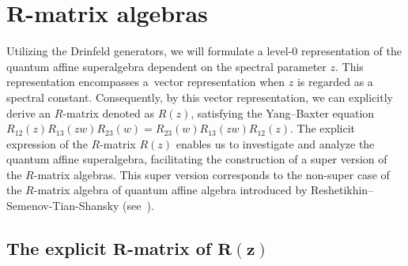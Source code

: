 \documentclass[10pt,a4paper]{amsart}
\numberwithin{equation}{section}
\begin{document}
\section[R-matrix algebras]{$\boldsymbol{R}$-matrix algebras}\label{sec4}
Utilizing the Drinfeld generators, we will formulate a level-$0$ representation of the quantum affine superalgebra dependent on the spectral parameter $z$. This representation encompasses a~vector representation when $z$ is regarded as a spectral constant. Consequently,
by this vector representation, we can explicitly derive an $R$-matrix denoted as $R(z)$, satisfying the Yang--Baxter equation
$R_{12}(z)R_{13}(zw)R_{23}(w)=R_{23}(w)R_{13}(zw)R_{12}(z)$. The explicit expression of the $R$-matrix
$R(z)$ enables us to investigate and analyze the quantum affine superalgebra, facilitating the construction of a super version of the $R$-matrix algebras. This super version corresponds to the non-super case of the $R$-matrix algebra of quantum affine algebra introduced by Reshetikhin--Semenov-Tian-Shansky (see~\cite{RS}).

\subsection[The explicit R-matrix of R(z)]{The explicit $\boldsymbol{R}$-matrix of $\boldsymbol{R(z)}$ }\label{sec4.1}
\end{document}
